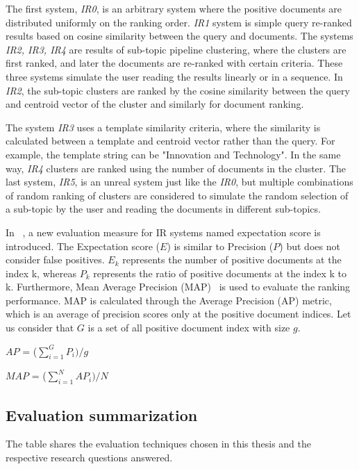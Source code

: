 \documentclass[master,proposal,extern,palatino]{rgseThesis}
\begin{document}
	The first system, \textit{IR0}, is an arbitrary system where the positive documents are distributed uniformly on the ranking order. \textit{IR1} system is simple query re-ranked results based on cosine similarity between the query and documents. The systems \textit{IR2, IR3, IR4} are results of sub-topic
	pipeline clustering, where the clusters are first ranked, and later the documents are re-ranked with
	certain criteria. These three systems simulate the user reading the results linearly or in
	a sequence.  In \textit{IR2}, the sub-topic clusters are ranked by the cosine similarity between the query and centroid vector of the cluster and similarly for document ranking. 
	
	The system \textit{IR3} uses a template similarity criteria, where the similarity is calculated between a template and centroid vector rather than the query. For example, the template string can be "Innovation and Technology". In the same way, \textit{IR4} clusters are ranked using the number of documents in the cluster. The last system, \textit{IR5}, is an unreal system just like the \textit{IR0}, but multiple combinations of random ranking of clusters are considered to simulate the random selection of a sub-topic by the user and reading the documents in different sub-topics. 
	
	In ~\cite{mehlitz2007new}, a new evaluation measure for IR systems named expectation score is introduced. The Expectation score ($E$) is similar to Precision ($P$) but does not consider false positives. $E_k$ represents the number of positive documents at the index k, whereas $P_k$ represents the ratio of positive documents at the index k to k. Furthermore, Mean Average Precision (MAP)~\cite{cormack2006statistical} is used to evaluate the ranking performance. MAP is calculated through the Average Precision (AP) metric, which is an average of precision scores only at the positive document indices. Let us consider that $G$ is a set of all positive document index with size $g$. 
	
	\centerline{$AP$ = ($\sum\limits_{i=1}^G P_i) /g$}
	
	\centerline{$MAP$ = ($\sum\limits_{i=1}^N AP_i) /N$}
	
	
	\subsection{Evaluation summarization}
	
	The table  shares the evaluation techniques chosen in this thesis and the respective research questions answered.
	
\end{document}
